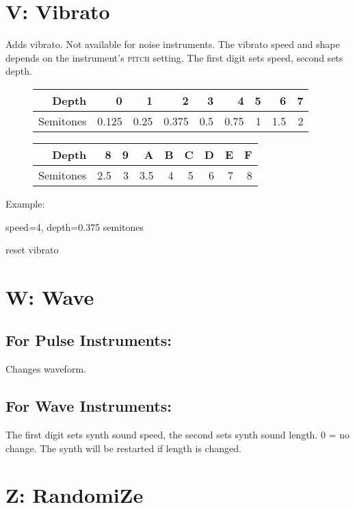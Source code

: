 \section{V: Vibrato}

Adds vibrato. Not available for noise instruments. The vibrato speed and shape depends on the instrument's \textsc{pitch} setting.
The first digit sets speed, second sets depth.

\begin{figure}[hbtp]
    \begin{tabular}{r|r|r|r|r|r|r|r|r}
        Depth & 0 & 1 & 2 & 3 & 4 & 5 & 6 & 7 \\
        \hline
        Semitones & 0.125 & 0.25 & 0.375 & 0.5 & 0.75 & 1 & 1.5 & 2 \\
    \end{tabular}

    \begin{tabular}{r|r|r|r|r|r|r|r|r}
        Depth & 8 & 9 & A & B & C & D & E & F \\
        \hline
        Semitones & 2.5 & 3 & 3.5 & 4 & 5 & 6 & 7 & 8 \\
    \end{tabular}
\end{figure}

\begin{description}
\item Example:
\item[V42] speed=4, depth=0.375 semitones
\item[V00] reset vibrato
\end{description}

\section{W: Wave}

\subsection{For Pulse Instruments:}
Changes waveform.

\subsection{For Wave Instruments:}
The first digit sets synth sound speed, the second sets synth sound length. 0 = no change. The synth will be restarted if length is changed.

\section{Z: RandomiZe}


